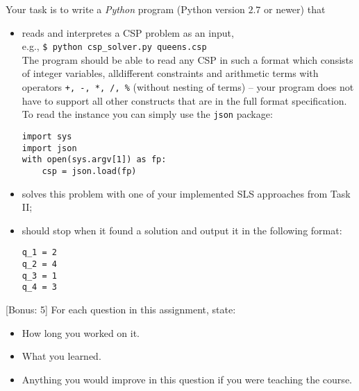 \documentclass{exam}
\begin{document}
\begin{questions}
		Your task is to write a \emph{Python} program (Python version $2.7$ or newer) that
		\begin{itemize}
		  \item reads and interpretes a CSP problem as an input,\\ e.g., \texttt{\$ python csp\_solver.py queens.csp}\\
		  The program should be able to read any CSP in such a format which consists of integer variables, alldifferent constraints and arithmetic terms with operators \texttt{+, -, *, /, \%} (without nesting of terms) -- your program does not have to support all other constructs that are in the full format specification.\\[1em]
		  To read the instance you can simply use the \texttt{json} package:
		\begin{verbatim}
import sys
import json
with open(sys.argv[1]) as fp:
    csp = json.load(fp)
		\end{verbatim}
		  \item solves this problem with one of your implemented SLS approaches from Task II;
		  \item should stop when it found a solution and output it in the following format:
 		\begin{verbatim}
q_1 = 2
q_2 = 4
q_3 = 1
q_4 = 3
		\end{verbatim}
		\end{itemize}

[Bonus: 5]
For each question in this assignment, state:
\begin{itemize}
	\item How long you worked on it.
	\item What you learned.
	\item Anything you would improve in this question if you were teaching the course.
\end{itemize}

\end{questions}



\end{document}
